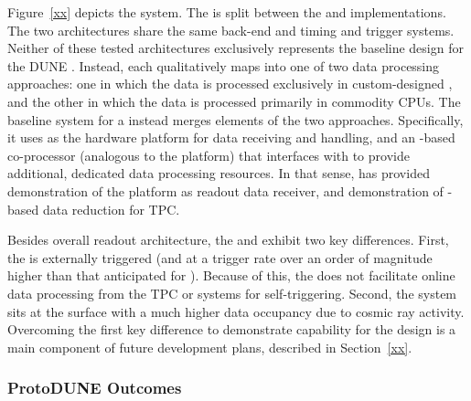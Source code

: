 Figure~\ref{xx} depicts the   system.  The  is split %
between the    and  implementations. The two architectures share the same back-end and
timing and trigger systems. 
Neither of these tested %
architectures %
exclusively represents the
baseline design for the DUNE . Instead, each %
qualitatively maps into one of
two data processing approaches: one in which the data is processed
exclusively in
custom-designed , and the other  in which the data is processed primarily in commodity
CPUs. The baseline system for a %
 instead
merges elements of the two approaches. Specifically, it uses    as
the hardware platform for data receiving and handling, and an
-based co-processor (analogous to the  platform) that
interfaces with    to provide additional, dedicated data processing
resources. In that sense, has provided demonstration of the
   platform as  readout data receiver, and
demonstration of -based data reduction for TPC.

Besides overall readout architecture, %
the  and
  exhibit two key differences. %
First, the   is externally
triggered (and at a trigger rate %
over an order of
magnitude higher than that anticipated for ). Because of this, 
the%
  
does not facilitate online data
processing from the TPC or  systems for self-triggering. %
Second, the  
system sits at the surface with a much higher %
data occupancy %
due to cosmic ray activity. %
Overcoming the first key difference to demonstrate  capability for the   design is a main component of future  development plans, described in Section~\ref{xx}.


\subsubsection{ProtoDUNE Outcomes}

